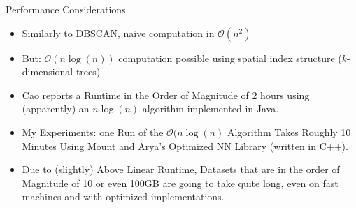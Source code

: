 \documentclass{beamer}
\begin{document}
\begin{frame}{Performance Considerations}
    \begin{itemize}
        \item Similarly to DBSCAN, naive computation in $\mathcal{O}(n^2)$ 
        \item But: $\mathcal{O}(n\log(n))$ computation possible using spatial index structure ($k$-dimensional trees)
        \item Cao reports a Runtime in the Order of Magnitude of 2 hours using (apparently) an $n\log(n)$ algorithm implemented in Java.
        \item My Experiments: one Run of the $\mathcal{O}(n\log(n)$ Algorithm Takes Roughly 10 Minutes Using Mount and Arya's Optimized NN Library (written in C++).
        \item Due to (slightly) Above Linear Runtime, Datasets that are in the order of Magnitude of 10 or even 100GB are going to take quite long, even on fast machines and with optimized implementations.
            
    \end{itemize}
\end{frame}
\end{document}
